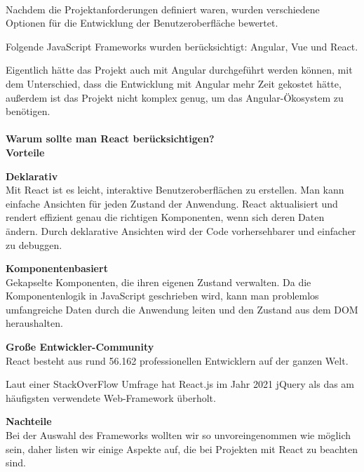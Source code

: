\paragraph{}

Nachdem die Projektanforderungen definiert waren, wurden verschiedene Optionen für die Entwicklung der Benutzeroberfläche bewertet.

Folgende JavaScript Frameworks wurden berücksichtigt: Angular, Vue und React.


Eigentlich hätte das Projekt auch mit Angular durchgeführt werden können, mit dem Unterschied, dass die Entwicklung mit Angular mehr Zeit gekostet hätte, außerdem ist das Projekt nicht komplex genug, um das Angular-Ökosystem zu benötigen.
\paragraph{}
\textbf{Warum sollte man React berücksichtigen?}\\
\newline
\textbf{Vorteile} 
\newline

\textbf{Deklarativ} \\
Mit React ist es leicht, interaktive Benutzeroberflächen zu erstellen. Man kann einfache Ansichten für jeden Zustand der Anwendung. React aktualisiert und rendert effizient genau die richtigen Komponenten, wenn sich deren Daten ändern.
Durch deklarative Ansichten wird der Code vorhersehbarer und einfacher zu debuggen.
\newline

\textbf{Komponentenbasiert}\\
Gekapselte Komponenten, die ihren eigenen Zustand verwalten.
Da die Komponentenlogik in JavaScript geschrieben wird, kann man problemlos umfangreiche Daten durch die Anwendung leiten und den Zustand aus dem DOM heraushalten.
\newline

\textbf{Große Entwickler-Community}\\
React besteht aus rund 56.162 professionellen Entwicklern auf der ganzen Welt.

Laut einer StackOverFlow Umfrage hat React.js im Jahr 2021 jQuery als das am häufigsten verwendete Web-Framework überholt.
\newline

\textbf{Nachteile}\\
Bei der Auswahl des Frameworks wollten wir so unvoreingenommen wie möglich sein, daher listen wir einige Aspekte auf, die bei Projekten mit React zu beachten sind.
\newline


